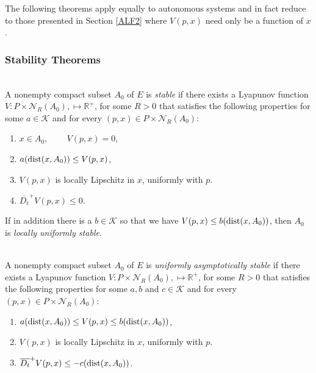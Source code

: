 


The following theorems apply equally to autonomous systems
and in fact reduce to those presented in Section \ref{ALF2} where
$V(p,x)$ need only be a function of $x$.


\subsubsection{Stability Theorems}

\begin{therm}
\label{LStherm} \hfill \\
  A nonempty compact subset $A_0$ of $E$ is {\em stable}
  if there exists a Lyapunov function $V:P \times
  \mathcal{N}_R(A_0), \mapsto \mathbb{R}^+$, for some $R>0$ that satisfies
  the following properties for some $a \in \mathcal{K}$ and for every
  $(p,x) \in P \times \mathcal{N}_R(A_0)$:
  \begin{enumerate}
    \item $x \in A_0$, $\qquad V(p,x)=0$,
    \item $a({\rm dist}(x,A_0)) \leq V(p,x)$,
    \item $V(p,x)$ is locally Lipschitz in $x$, uniformly with $p$.
    \item $\overline{D_t}^{+} V(p,x) \leq 0$.
  \end{enumerate}
  If in addition there is a $b \in \mathcal{K}$ so that we have $V(p,x)
  \leq b({\rm dist}(x,A_0))$, then $A_0$ is {\em locally uniformly stable}.
\end{therm}

\begin{therm}
\label{LAStherm} \hfill \\
  A nonempty compact subset $A_0$ of $E$ is {\em uniformly
  asymptotically stable} if there exists a Lyapunov function
  $V:P \times \mathcal{N}_R(A_0), \mapsto \mathbb{R}^+$, for
  some $R>0$ that satisfies the following properties for some $a,b$ and $c
  \in \mathcal{K}$ and for every $(p,x) \in P \times
  \mathcal{N}_R(A_0)$:
  \begin{enumerate}
    \item $a({\rm dist}(x,A_0)) \leq V(p,x) \leq b({\rm dist}(x,A_0))$,
    \item $V(p,x)$ is locally Lipschitz in $x$, uniformly with $p$.
    \item $\overline{D_t}^{+} V(p,x) \leq -c({\rm dist}(x,A_0))$.
  \end{enumerate}
\end{therm}

